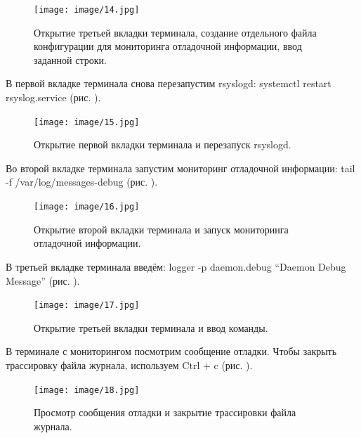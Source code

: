 \documentclass[
  english,
  russian,
  12pt,
  a4paper,
  DIV=11,
  numbers=noendperiod]{scrreprt}
\begin{document}
\begin{figure}

{\centering \texttt{[image: image/14.jpg]}

}

\caption{Открытие третьей вкладки терминала, создание отдельного файла
конфигурации для мониторинга отладочной информации, ввод заданной
строки.}

\end{figure}%

В первой вкладке терминала снова перезапустим rsyslogd: systemctl
restart rsyslog.service (рис. \autocite*{fig:015}).

\begin{figure}

{\centering \texttt{[image: image/15.jpg]}

}

\caption{Открытие первой вкладки терминала и перезапуск rsyslogd.}

\end{figure}%

Во второй вкладке терминала запустим мониторинг отладочной информации:
tail -f /var/log/messages-debug (рис. \autocite*{fig:016}).

\begin{figure}

{\centering \texttt{[image: image/16.jpg]}

}

\caption{Открытие второй вкладки терминала и запуск мониторинга
отладочной информации.}

\end{figure}%

В третьей вкладке терминала введём: logger -p daemon.debug
\enquote{Daemon Debug Message} (рис. \autocite*{fig:017}).

\begin{figure}

{\centering \texttt{[image: image/17.jpg]}

}

\caption{Открытие третьей вкладки терминала и ввод команды.}

\end{figure}%

В терминале с мониторингом посмотрим сообщение отладки. Чтобы закрыть
трассировку файла журнала, используем Ctrl + c (рис.
\autocite*{fig:018}).

\begin{figure}

{\centering \texttt{[image: image/18.jpg]}

}

\caption{Просмотр сообщения отладки и закрытие трассировки файла
журнала.}

\end{figure}%
\end{document}
